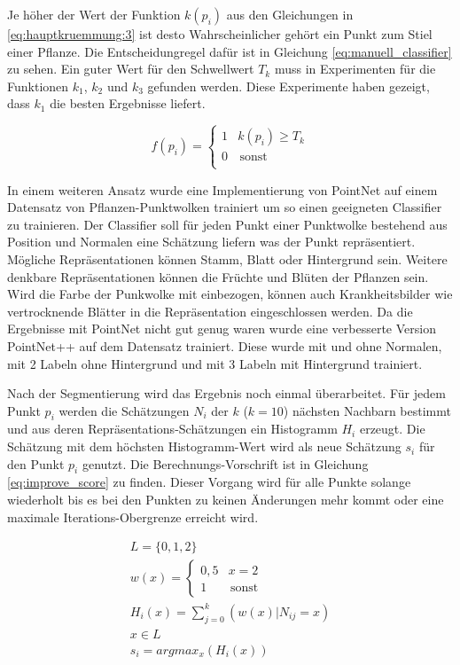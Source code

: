 \documentclass[12pt,titlepage, twoside]{article}
\begin{document}
Je höher der Wert der Funktion $k(p_i)$ aus den Gleichungen in \ref{eq:hauptkruemmung:3} ist desto Wahrscheinlicher gehört ein Punkt zum Stiel einer Pflanze. Die Entscheidungregel dafür ist in Gleichung \ref{eq:manuell_classifier} zu sehen.
Ein guter Wert für den Schwellwert $T_k$ muss in Experimenten für die Funktionen $k_1$, $k_2$ und $k_3$ gefunden werden. Diese Experimente haben gezeigt, dass $k_1$ die besten Ergebnisse liefert.

\begin{equation}
\label{eq:manuell_classifier}
f(p_i) = \left\{
\begin{array}{ll}
1 & k(p_i) \geq T_k \\
0 & \, \textrm{sonst} \\
\end{array}
\right. 
\end{equation}

In einem weiteren Ansatz wurde eine Implementierung von PointNet auf einem Datensatz von Pflanzen-Punktwolken trainiert um so einen geeigneten Classifier zu trainieren.
Der Classifier soll für jeden Punkt einer Punktwolke bestehend aus Position und Normalen eine Schätzung liefern was der Punkt repräsentiert. Mögliche Repräsentationen können Stamm, Blatt oder Hintergrund sein.
Weitere denkbare Repräsentationen können die Früchte und Blüten der Pflanzen sein. Wird die Farbe der Punkwolke mit einbezogen, können auch Krankheitsbilder wie vertrocknende Blätter in die Repräsentation eingeschlossen werden.  
Da die Ergebnisse mit PointNet nicht gut genug waren wurde eine verbesserte Version PointNet++ auf dem Datensatz trainiert. Diese wurde mit und ohne Normalen, mit 2 Labeln ohne Hintergrund und mit 3 Labeln mit Hintergrund trainiert.

Nach der Segmentierung wird das Ergebnis noch einmal überarbeitet. Für jedem Punkt $p_i$ werden die Schätzungen $N_i$ der $k$ ($k=10$) nächsten Nachbarn bestimmt und aus deren Repräsentations-Schätzungen ein Histogramm $H_i$ erzeugt.
Die Schätzung mit dem höchsten Histogramm-Wert wird als neue Schätzung $s_i$ für den Punkt $p_i$ genutzt. Die Berechnungs-Vorschrift ist in Gleichung \ref{eq:improve_score} zu finden. 
Dieser Vorgang wird für alle Punkte solange wiederholt bis es bei den Punkten zu keinen Änderungen mehr kommt oder eine maximale Iterations-Obergrenze erreicht wird.

\begin{equation}
\label{eq:improve_score}
\begin{array}{l}
L =  \{0,1,2\}\\
w(x) = \left\{
\begin{array}{ll}
0,5 & x = 2 \\
1 & \, \textrm{sonst} 
\end{array}
\right.\\ 
H_i(x) = \sum_{j=0}^{k}{(w(x) | N_{ij} = x)}\\
x \in L\\
s_i = argmax_x(H_i(x))
\end{array}
\end{equation}
\end{document}

